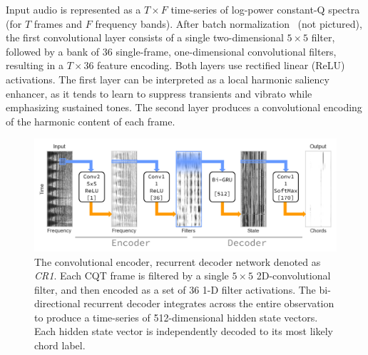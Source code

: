 \documentclass{article}
\begin{document}
Input audio is represented as a $T\times F$ time-series of log-power constant-Q spectra (for $T$ frames and $F$ frequency bands).
After batch normalization~\cite{ioffe2015batch} (not pictured), the first convolutional layer consists of a single two-dimensional $5\times5$ filter, followed by a bank of $36$ single-frame, one-dimensional convolutional filters, resulting in a $T\times 36$ feature encoding.
Both layers use rectified linear (ReLU) activations.
The first layer can be interpreted as a local harmonic saliency enhancer, as it tends to learn to suppress transients and vibrato while emphasizing sustained tones.
The second layer produces a convolutional encoding of the harmonic content of each frame.

\begin{figure}[t]
    \centering
    \includegraphics[width=\columnwidth]{crnn1}
    \caption{The convolutional encoder, recurrent decoder network denoted as \emph{CR1}.
            Each CQT frame is filtered by a single $5\times 5$ 2D-convolutional filter, and then encoded as a set of 36 1-D filter activations.
            The bi-directional recurrent decoder integrates across the entire observation to produce a time-series of 512-dimensional hidden state vectors. 
            Each hidden state vector is independently decoded to its most likely chord label.\label{fig:crnn1}}
\end{figure}
\end{document}
